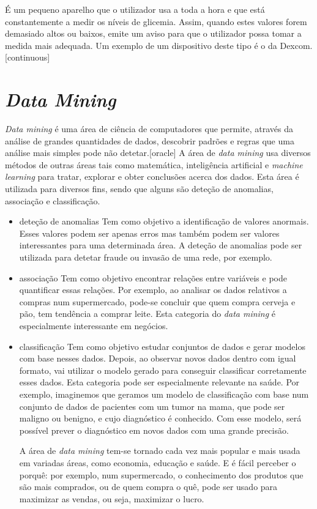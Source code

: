 É um pequeno aparelho que o utilizador usa a toda a hora e que está constantemente a medir os níveis de glicemia. Assim, quando estes valores forem demasiado altos ou baixos, emite um aviso para que o utilizador possa tomar a medida mais adequada. Um exemplo de um dispositivo deste tipo é o da Dexcom. [continuous]


\section{\textit{Data Mining}}

\textit{Data mining} é uma área de ciência de computadores que permite, através da análise de grandes quantidades de dados, descobrir padrões e regras que uma análise mais simples pode não detetar.[oracle]
A área de \textit{data mining} usa diversos métodos de outras áreas tais como matemática, inteligência artificial e \textit{machine learning} para tratar, explorar e obter conclusões acerca dos dados. Esta área é utilizada para diversos fins, sendo que alguns são deteção de anomalias, associação e classificação. 

\begin{itemize}

\item{deteção de anomalias}
Tem como objetivo a identificação de valores anormais. Esses valores podem ser apenas erros mas também podem ser valores interessantes para uma determinada área. A deteção de anomalias pode ser utilizada para detetar fraude ou invasão de uma rede, por exemplo.

\item{associação}
Tem como objetivo encontrar relações entre variáveis e pode quantificar essas relações. Por exemplo, ao analisar os dados relativos a compras num supermercado, pode-se concluir que quem compra cerveja e pão, tem tendência a comprar leite. Esta categoria do \textit{data mining} é especialmente interessante em negócios.

\item{classificação}
Tem como objetivo estudar conjuntos de dados e gerar modelos com base nesses dados. Depois, ao observar novos dados dentro com igual formato, vai utilizar o modelo gerado para conseguir classificar corretamente esses dados. Esta categoria pode ser especialmente relevante na saúde. Por exemplo, imaginemos que geramos um modelo de classificação com base num conjunto de dados de pacientes com um tumor na mama, que pode ser maligno ou benigno, e cujo diagnóstico é conhecido. Com esse modelo, será possível prever o diagnóstico em novos dados com uma grande precisão. 

A área de \textit{data mining} tem-se tornado cada vez mais popular e mais usada em variadas áreas, como economia, educação e saúde. E é fácil perceber o porquê: por exemplo, num supermercado,    o conhecimento dos produtos que são mais comprados, ou de quem compra o quê, pode ser usado para maximizar as vendas, ou seja, maximizar o lucro. 

\end{itemize}

